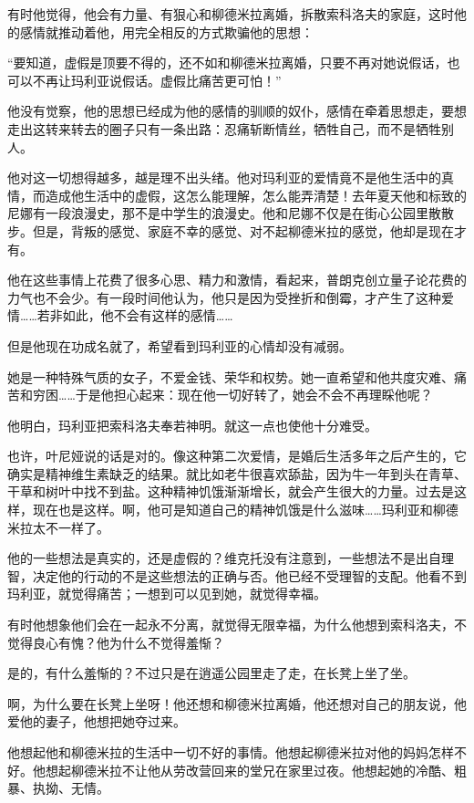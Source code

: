 有时他觉得，他会有力量、有狠心和柳德米拉离婚，拆散索科洛夫的家庭，这时他的感情就推动着他，用完全相反的方式欺骗他的思想：

“要知道，虚假是顶要不得的，还不如和柳德米拉离婚，只要不再对她说假话，也可以不再让玛利亚说假话。虚假比痛苦更可怕！”

他没有觉察，他的思想已经成为他的感情的驯顺的奴仆，感情在牵着思想走，要想走出这转来转去的圈子只有一条出路：忍痛斩断情丝，牺牲自己，而不是牺牲别人。

他对这一切想得越多，越是理不出头绪。他对玛利亚的爱情竟不是他生活中的真情，而造成他生活中的虚假，这怎么能理解，怎么能弄清楚！去年夏天他和标致的尼娜有一段浪漫史，那不是中学生的浪漫史。他和尼娜不仅是在街心公园里散散步。但是，背叛的感觉、家庭不幸的感觉、对不起柳德米拉的感觉，他却是现在才有。

他在这些事情上花费了很多心思、精力和激情，看起来，普朗克创立量子论花费的力气也不会少。有一段时间他认为，他只是因为受挫折和倒霉，才产生了这种爱情……若非如此，他不会有这样的感情……

但是他现在功成名就了，希望看到玛利亚的心情却没有减弱。

她是一种特殊气质的女子，不爱金钱、荣华和权势。她一直希望和他共度灾难、痛苦和穷困……于是他担心起来：现在他一切好转了，她会不会不再理睬他呢？

他明白，玛利亚把索科洛夫奉若神明。就这一点也使他十分难受。

也许，叶尼娅说的话是对的。像这种第二次爱情，是婚后生活多年之后产生的，它确实是精神维生素缺乏的结果。就比如老牛很喜欢舔盐，因为牛一年到头在青草、干草和树叶中找不到盐。这种精神饥饿渐渐增长，就会产生很大的力量。过去是这样，现在也是这样。啊，他可是知道自己的精神饥饿是什么滋味……玛利亚和柳德米拉太不一样了。

他的一些想法是真实的，还是虚假的？维克托没有注意到，一些想法不是出自理智，决定他的行动的不是这些想法的正确与否。他已经不受理智的支配。他看不到玛利亚，就觉得痛苦；一想到可以见到她，就觉得幸福。

有时他想象他们会在一起永不分离，就觉得无限幸福，为什么他想到索科洛夫，不觉得良心有愧？他为什么不觉得羞惭？

是的，有什么羞惭的？不过只是在逍遥公园里走了走，在长凳上坐了坐。

啊，为什么要在长凳上坐呀！他还想和柳德米拉离婚，他还想对自己的朋友说，他爱他的妻子，他想把她夺过来。

他想起他和柳德米拉的生活中一切不好的事情。他想起柳德米拉对他的妈妈怎样不好。他想起柳德米拉不让他从劳改营回来的堂兄在家里过夜。他想起她的冷酷、粗暴、执拗、无情。

